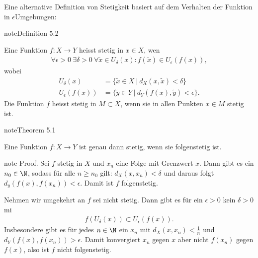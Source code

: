 \documentclass[letterpaper,10pt,english]{jupyterBook}
\begin{document}
Eine alternative Definition von Stetigkeit basiert auf dem Verhalten der Funktion in \(\epsilon\)\sphinxhyphen{}Umgebungen:
\label{stetigkeit/stetigkeit:definition-3}
\begin{sphinxadmonition}{note}{Definition 5.2}



Eine Funktion \(f: X \rightarrow Y\) heisst stetig in \(x \in X\), wen
\begin{equation*}
\begin{split} \forall \epsilon > 0 ~\exists \delta > 0 ~\forall \tilde{x} \in U_\delta(x): f(\tilde x) \in U_\epsilon(f(x)),\end{split}
\end{equation*}
wobei
\begin{align*}
U_\delta(x) &= \{\tilde x \in X~|~d_X(x,\tilde x) < \delta \} \\
U_\epsilon(f(x)) &= \{\tilde y \in Y~|~d_Y(f(x),\tilde y) < \epsilon \}.
\end{align*}
Die Funktion \(f\) heisst stetig in \(M \subset X\), wenn sie in allen Punkten \(x\in M\) stetig ist.
\end{sphinxadmonition}
\label{stetigkeit/stetigkeit:theorem-4}
\begin{sphinxadmonition}{note}{Theorem 5.1}



Eine Funktion \(f: X \rightarrow Y\) ist genau dann stetig, wenn sie folgenstetig ist.
\end{sphinxadmonition}

\begin{sphinxadmonition}{note}
Proof.  Sei \(f\) stetig in \(X\) und \(x_n\) eine Folge mit Grenzwert \(x\). Dann gibt es ein \(n_0 \in \N\), sodass für alle \(n \geq n_0\) gilt: \( d_X(x,x_n) < \delta\) und daraus folgt \( d_y(f(x),f(x_n)) < \epsilon\). Damit ist \(f\) folgenstetig.

Nehmen wir umgekehrt an \(f\) sei nicht stetig. Dann gibt es für ein \(\epsilon > 0\) kein \(\delta > 0\) mi
\begin{equation*}
\begin{split} f(U_\delta(x)) \subset U_\epsilon (f(x)).\end{split}
\end{equation*}
Insbesondere gibt es für jedes \(n \in \N\) ein \(x_n\) mit \(d_X(x,x_n) < \frac{1}n\) und \(d_Y(f(x),f(x_n)) > \epsilon\). Damit konvergiert \(x_n\) gegen \(x\) aber nicht \(f(x_n)\) gegen \(f(x)\), also ist \(f\) nicht folgenstetig.
\end{sphinxadmonition}
\end{document}
